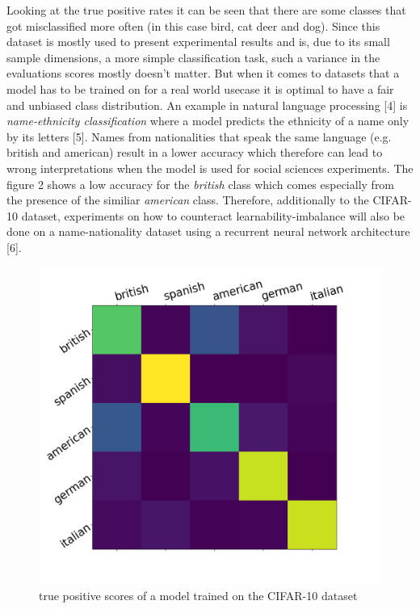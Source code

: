 \documentclass[journal]{IEEEtran}
\begin{document}
Looking at the true positive rates it can be seen that there are some classes that got misclassified more often (in this case bird, cat deer and dog). 
Since this dataset is mostly used to present experimental results and is, due to its small sample dimensions, a more simple classification task, 
such a variance in the evaluations scores mostly doesn't matter. But when it comes to datasets that a model has to be trained on for a real world usecase 
it is optimal to have a fair and unbiased class distribution. An example in natural language processing [4] is \emph{name-ethnicity classification} 
where a model predicts the ethnicity of a name only by its letters [5]. Names from nationalities that speak the same language (e.g. british and american) result in a lower accuracy
which therefore can lead to wrong interpretations when the model is used for social sciences experiments. The figure 2 shows a low accuracy for the \emph{british} class which comes
especially from the presence of the similiar \emph{american} class.
Therefore, additionally to the CIFAR-10 dataset, experiments on how to counteract learnability-imbalance will also be done on a name-nationality dataset using a recurrent neural network architecture [6].

\begin{figure}[h!]
        \includegraphics[width=\linewidth]{images/nec_confusion_matrix.png}
        \caption{true positive scores of a model trained on the CIFAR-10 dataset}
        \label{fig:tp2_scores}
\end{figure}
\end{document}
